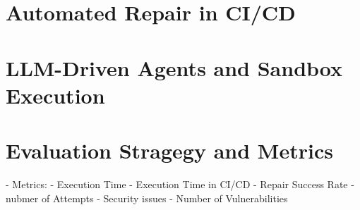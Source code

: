\section{Automated Repair in CI/CD }
\section{LLM-Driven Agents and Sandbox Execution}
\section{Evaluation Stragegy and Metrics}
- Metrics:
- Execution Time
- Execution Time in CI/CD
- Repair Success Rate
- nubmer of Attempts
- Security issues
- Number of Vulnerabilities

